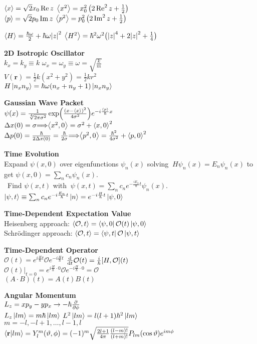 \documentclass[11pt, a4paper]{article}
\newcommand{\newsec}[1]{\vspace{2mm}\textbf{#1}\\}
\renewcommand{\vec}[1]{\bm{#1}} %
\newcommand{\tev}{e^{-i\frac{H}{\hbar}t}}  %
\newcommand{\tevp}{e^{i\frac{H}{\hbar}t}}  %
\renewcommand{\O}{\mathcal{O}}  %
\let\spaceyimplies\implies
\renewcommand{\implies}{\hspace{-1mm}\spaceyimplies\hspace{-1mm}}
\begin{document}
\begin{multicols}{2}
$ \ev{x} = \sqrt{2} x_{0}\Re z $ \qquad $ \ev{x^{2}}  = x_{0}^{2}\left(2 \Re^{2}z + \tfrac{1}{2}\right) $\\
$ \ev{p} = \sqrt{2}p_{0}\Im z $ \qquad $ \ev{p^{2}} = p_{0}^{2}\left(2 \Im^{2}z + \tfrac{1}{2}\right) $

$ \ev{H} = \frac{\hbar \omega}{2} + \hbar \omega \abs{z}^{2} $ \quad $ \ev{H^{2}} = \hbar^{2} \omega^{2} \big(\abs{z}^{4} + 2\abs{z}^{2} + \tfrac{1}{4}\big) $


\newsec{2D Isotropic Oscillator}
$ k_{x} = k_{y} \equiv k $ \quad  $ \omega_{x} = \omega_{y} \equiv \omega = \sqrt{\frac{k}{m}}$\\
$ V(\vec{r}) = \frac{1}{2}k(x^{2} + y^{2}) = \frac{1}{2}kr^{2} $\\
$ H\ket{n_{x}n_{y}} = \hbar \omega (n_{x} + n_{y} + 1)\ket{n_{x}n_{y}} $


\newsec{Gaussian Wave Packet}
$ \psi(x) = \frac{1}{\sqrt[4]{2\pi \sigma^{2}}} \exp(\frac{(x - \ev{x})^{2}}{4 \sigma^{2}})e^{-i\frac{\ev{p}}{\hbar}x} $\\
$ \Delta x(0) = \sigma \implies \ev{x^{2}, 0} = \sigma^{2} + \ev{x, 0}^{2} $\\
$ \Delta p(0) = \frac{\hbar}{2\Delta x(0)} = \frac{\hbar}{2\sigma} \implies \ev{p^{2}, 0} = \frac{\hbar^{2}}{4\sigma^{2}} + \ev{p, 0}^{2} $

\newsec{Time Evolution}
Expand $ \psi(x, 0) $ over eigenfunctions $ \psi_{n}(x) $ solving
${} \ H \psi_{n}(x) = E_{n}\psi_{n}(x) $ to get $ \psi(x, 0) = \sum_{n} c_{n} \psi_{n}(x) $. \\[1mm]
\null \ Find $ \psi(x, t) $ with ${} \ \psi(x, t) = \sum_{n} c_{n}e^{-\frac{iE_{n}}{\hbar}t}\psi_{n}(x) $.\\
$ \ket{\psi, t} \equiv \sum_{n} c_{n}e^{-i \frac{E_{n}}{\hbar}t}\ket{n} = e^{-i\frac{H}{\hbar}t}\ket{\psi, 0} $

\newsec{Time-Dependent Expectation Value}
Heisenberg approach: $ \ev{\O, t} = \bra{\psi, 0} \O(t) \ket{\psi, 0} $\\
Schr\"{o}dinger approach: $ \ev{\O, t} = \bra{\psi, t} \O \ket{\psi, t} $

\newsec{Time-Dependent Operator}
$ \O(t) = \tevp \O \tev $ \qquad $ \dv{t}\O(t) = \frac{i}{\hbar}[H, \O](t) $\\
$ \O(t)\big |_{t = 0} = e^{i\frac{H}{\hbar}\cdot 0}\O e^{-i\frac{H}{\hbar}\cdot 0} = \O $\\
$ (A\cdot B)(t) = A(t) B(t) $

\newsec{Angular Momentum}
$ L_{z} = xp_{y} - yp_{x} \to - \hbar \pdv{\phi}$\\
$L_z \ket{lm} = m \hbar \ket{lm}$ \qquad $L^2 \ket{lm} = l(l+1)\hbar^2 \ket{lm}$ \\
$m = -l, -l + 1, \dots, l - 1, l$ \\
$\braket{\vb r}{lm} = Y_l^m(\vartheta, \phi) = (-1)^m \sqrt{\frac{2l + 1}{4 \pi} \frac{(l-m)!}{(l + m)!}} P_{lm}(\cos \vartheta) e^{i m \phi}$\\


\end{multicols}
\end{document}
